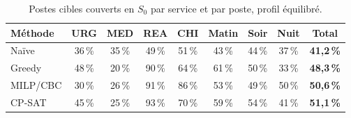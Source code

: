 \begin{table}[H]
    \centering
    \caption{Postes cibles couverts en $S_0$ par service et par poste, profil équilibré.}
    \label{tab:couverture_s0}
    \small
    \begin{tabular}{lcccc|ccc|c}
        \toprule
        \textbf{Méthode} & \textbf{URG} & \textbf{MED} & \textbf{REA} & \textbf{CHI} & \textbf{Matin} & \textbf{Soir} & \textbf{Nuit} & \textbf{Total} \\
        \midrule
        Naïve & 36\,\% & 35\,\% & 49\,\% & 51\,\% & 43\,\% & 44\,\% & 37\,\% & \textbf{41{,}2\,\%} \\
        Greedy & 48\,\% & 20\,\% & 90\,\% & 64\,\% & 61\,\% & 50\,\% & 33\,\% & \textbf{48{,}3\,\%} \\
        MILP/CBC & 30\,\% & 26\,\% & 91\,\% & 86\,\% & 53\,\% & 49\,\% & 50\,\% & \textbf{50{,}6\,\%} \\
        CP-SAT & 45\,\% & 25\,\% & 93\,\% & 70\,\% & 59\,\% & 54\,\% & 41\,\% & \textbf{51{,}1\,\%} \\
        \bottomrule
    \end{tabular}
\end{table}
